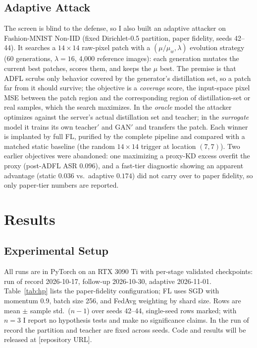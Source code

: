\documentclass[conference]{IEEEtran}
\begin{document}
\subsection{Adaptive Attack}
\label{sec:adaptivemethod}
The screen is blind to the defense, so I also built an adaptive attacker on Fashion-MNIST Non-IID (fixed Dirichlet-0.5 partition, paper fidelity, seeds 42--44). It searches a $14{\times}14$ raw-pixel patch with a $(\mu/\mu_w,\lambda)$ evolution strategy (60 generations, $\lambda=16$, 4{,}000 reference images): each generation mutates the current best patches, scores them, and keeps the $\mu$ best. The premise is that ADFL scrubs only behavior covered by the generator's distillation set, so a patch far from it should survive; the objective is a \emph{coverage} score, the input-space pixel MSE between the patch region and the corresponding region of distillation-set or real samples, which the search maximizes. %
In the \emph{oracle} model the attacker optimizes against the server's actual distillation set and teacher; in the \emph{surrogate} model it trains its own teacher$'$ and GAN$'$ and transfers the patch. Each winner is implanted by full FL, purified by the complete pipeline and compared with a matched static baseline (the random $14{\times}14$ trigger at location $(7,7)$). Two earlier objectives were abandoned: one maximizing a proxy-KD excess overfit the proxy (post-ADFL ASR $0.096$), and a fast-tier diagnostic showing an apparent advantage (static $0.036$ vs.\ adaptive $0.174$) did not carry over to paper fidelity, so only paper-tier numbers are reported.

\section{Results}
\subsection{Experimental Setup}
All runs are in PyTorch \cite{paszke2019pytorch} on an RTX 3090 Ti with per-stage validated checkpoints: run of record 2026-10-17, follow-up 2026-10-30, adaptive 2026-11-01. Table~\ref{tab:hp} lists the paper-fidelity configuration; FL uses SGD with momentum 0.9, batch size 256, and FedAvg weighting by shard size. Rows are mean $\pm$ sample std.\ ($n-1$) over seeds 42--44, single-seed rows marked; with $n=3$ I report no hypothesis tests and make no significance claims. In the run of record the partition and teacher are fixed across seeds. Code and results will be released at [repository URL].
\end{document}
